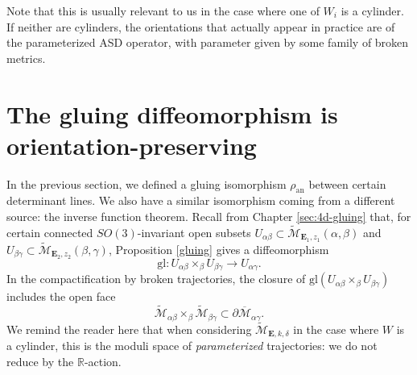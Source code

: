 \documentclass{memo-l}
\theoremstyle{definition}
\theoremstyle{remark}
\numberwithin{section}{chapter}
\numberwithin{equation}{chapter}
\begin{document}
Note that this is usually relevant to us in the case where one of $W_i$ is a cylinder. If neither are cylinders, the orientations that actually appear in practice are of the parameterized ASD operator, with parameter given by some family of broken metrics. 

\section{The gluing diffeomorphism is orientation-preserving}\label{sec:or-gluing2}
In the previous section, we defined a gluing isomorphism $\rho_{\text{an}}$ between certain determinant lines. We also have a similar isomorphism coming from a different source: the inverse function theorem. Recall from Chapter \ref{sec:4d-gluing} that, for certain connected $SO(3)$-invariant open subsets $U_{\alpha \beta} \subset \widetilde{\mathcal M}_{\mathbf{E}_1,z_1}(\alpha, \beta)$ and $U_{\beta \gamma} \subset \widetilde{\mathcal M}_{\mathbf{E}_2, z_2}(\beta, \gamma)$, Proposition \ref{gluing} gives a diffeomorphism 
$$\text{gl}: U_{\alpha \beta} \times_\beta U_{\beta \gamma} \to U_{\alpha \gamma}.$$ 
In the compactification by broken trajectories, the closure of $\text{gl}(U_{\alpha \beta} \times_\beta U_{\beta \gamma})$ includes the open face 
$$\widetilde{\mathcal M}_{\alpha \beta} \times_\beta \widetilde{\mathcal M}_{\beta \gamma} \subset \partial \overline{\mathcal M}_{\alpha \gamma}.$$ 
We remind the reader here that when considering $\widetilde{\mathcal M}_{\mathbf{E}, k, \delta}$ in the case where $W$ is a cylinder, this is the moduli space of \emph{parameterized} trajectories: we do not reduce by the $\mathbb R$-action.
\end{document}
